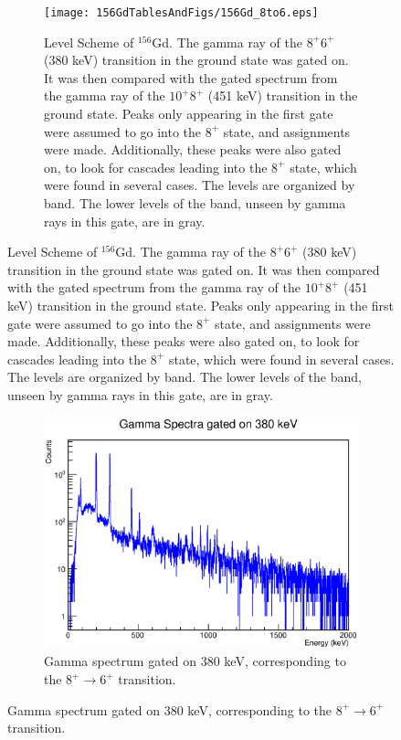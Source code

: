 \begin{figure}[!]
    \centering
    \begin{subfigure}{\textwidth}
    \texttt{[image: 156GdTablesAndFigs/156Gd\_8to6.eps]}
    \caption{\label{fig:156_8to6level}Level Scheme of $^{156}$Gd. The gamma ray of the $8^+$\rightarrow$6^+$ (380 keV) transition in the ground state was gated on. It was then compared with the gated spectrum from the gamma ray of the $10^+$\rightarrow$8^+$ (451 keV) transition in the ground state. Peaks only appearing in the first gate were assumed to go into the $8^+$ state, and assignments were made. Additionally, these peaks were also gated on, to look for cascades leading into the $8^+$ state, which were found in several cases. The levels are organized by band. The lower levels of the band, unseen by gamma rays in this gate, are in gray.}
    \end{subfigure}
    \label{fig:156_8to6}
    \end{figure}
\begin{landscape}
    \begin{figure}
    \ContinuedFloat
    \begin{subfigure}{1.4\textwidth}
    \includegraphics[]{156GdTablesAndFigs/380GateSpectrum.eps}
    \caption{Gamma spectrum gated on 380 keV, corresponding to the $8^+\rightarrow6^+$ transition.}
    \label{fig:156_8to6spec}
    \end{subfigure}
\end{figure}
\end{landscape}